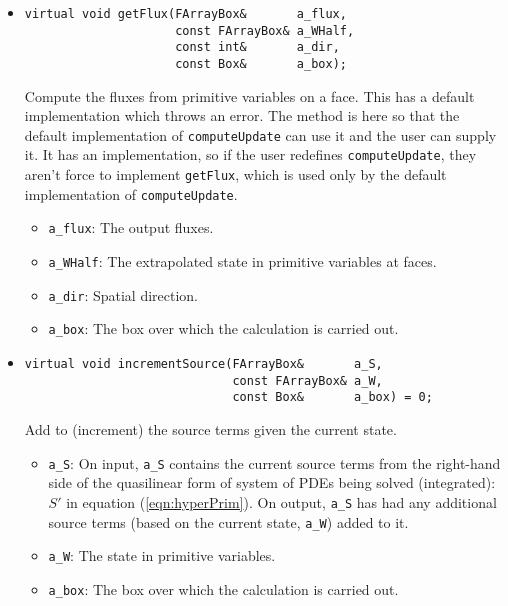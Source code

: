 \begin{itemize}
\item \begin{small}\begin{verbatim}
virtual void getFlux(FArrayBox&       a_flux,
                     const FArrayBox& a_WHalf,
                     const int&       a_dir,
                     const Box&       a_box);
\end{verbatim}\end{small}
Compute the fluxes from primitive variables on a face.
This has a default implementation which throws an error.  The method is
here so that the default implementation of \verb/computeUpdate/ can use it
and the user can supply it.  It has an implementation, so if the user
redefines \verb/computeUpdate/, they aren't force to implement \verb/getFlux/, which
is used only by the default implementation of \verb/computeUpdate/.
\begin{itemize}
\item \verb/a_flux/:  The output fluxes.
\vspace{-0.07in}
\item \verb/a_WHalf/:  The extrapolated state in primitive variables at faces.
\vspace{-0.07in}
\item \verb/a_dir/: Spatial direction.
\vspace{-0.07in}
\item \verb/a_box/:  The box over which the calculation is carried out.
\end{itemize}

\item \begin{small}\begin{verbatim}
virtual void incrementSource(FArrayBox&       a_S,
                             const FArrayBox& a_W,
                             const Box&       a_box) = 0;
\end{verbatim}\end{small}
Add to (increment) the source terms given the current state.
\begin{itemize}
\item \verb/a_S/:  On input, \verb/a_S/ contains the current source terms from
                   the right-hand side of the quasilinear form of system of PDEs being
                   solved (integrated): $S'$ in equation (\ref{eqn:hyperPrim}).
                   On output, \verb/a_S/ has had any additional source terms
                   (based on the current state, \verb/a_W/) added to it.
\vspace{-0.07in}
\item \verb/a_W/:  The state in primitive variables.
\vspace{-0.07in}
\item \verb/a_box/:  The box over which the calculation is carried out.
\end{itemize}


\end{itemize}
